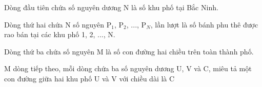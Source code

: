 Dòng đầu tiên chứa số nguyên dương N là số khu phố tại Bắc Ninh.

Dòng thứ hai chứa N số nguyên P$_1$, P$_2$, ..., P$_N$, lần lượt là số bánh phu thê được rao bán tại các khu phố 1, 2, ..., N.

Dòng thứ ba chứa số nguyên M là số con đường hai chiều trên toàn thành phố.

M dòng tiếp theo, mỗi dòng chứa ba số nguyên dương U, V và C, miêu tả một con đường giữa hai khu phố U và V với chiều dài là C